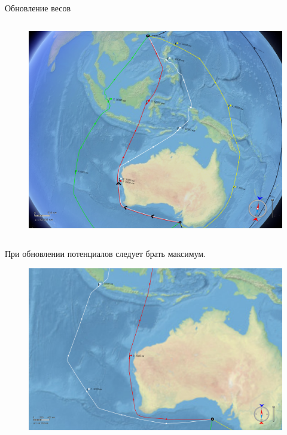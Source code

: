 \documentclass[russian, hyperref={unicode}]{beamer}
\theoremstyle{definition}
\begin{document}
\begin{frame}{Обновление весов}
{\begin{columns}
            \begin{figure}
                \includegraphics[clip=true, trim = 280pt 0 20pt 0, width=\textwidth]{potentials-update/max_result}
            \end{figure}
        \end{columns}
        
        \begin{center}
            При обновлении потенциалов следует брать максимум.
        \end{center}
    }
   
     {
        \begin{figure}
          \begin{columns}
            \includegraphics[clip=true, trim = 300pt 20pt 330pt 350pt, width=\textwidth]{weights-on-path-bad}


\end{columns}
\end{figure}}
\end{frame}
\end{document}
